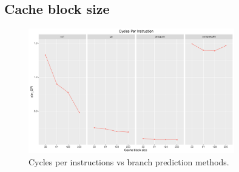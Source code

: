 \documentclass[10pt]{scrartcl}
\begin{document}
\FloatBarrier

\subsection{Cache block size}

\begin{figure}[h]
  \centering
  \includegraphics[width=0.8\textwidth]{Plots/plot_CacheBS_sim_CPI}
  \caption{Cycles per instructions vs branch prediction methods.}\label{fig:cache-bs_sim_cpi}
\end{figure}
\end{document}
